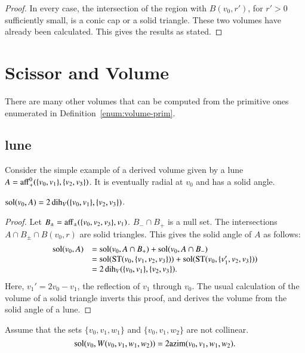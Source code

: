 \begin{proof} In every case, the intersection of 
  the region with $B(v_0,r')$, for $r'>0$ sufficiently small, is
  a conic cap or a solid triangle.  These two volumes have
  already been calculated.  This gives the results as stated.
\end{proof}


\section{Scissor and Volume}

There are many other volumes that can be computed from the
primitive ones enumerated in Definition~\ref{enum:volume-prim}.

\subsection{lune}  

Consider the simple example of a derived volume given by a
lune $A={\operatorname{aff}}_+^0(\{v_0,v_1\},\{v_2,v_3\})$.  It is eventually
radial at $v_0$ and has a solid angle.

\begin{lemma}  $\operatorname{sol}(v_0,A) = 2\operatorname{dih}_V(\{v_0,v_1\},\{v_2,v_3\})$.
\end{lemma}

\begin{proof}
Let $B_{\pm} = {\operatorname{aff}}_\pm(\{v_0,v_2,v_3\},v_1)$.  $B_- \cap B_+$
is a null set.  The intersections $A\cap B_{\pm}\cap B(v_0,r)$ 
are solid triangles.  This gives the solid angle of $A$ as
follows:
   $$\begin{array}{lll}
   \operatorname{sol}(v_0,A) &= \operatorname{sol}(v_0,A\cap B_+)+\operatorname{sol}(v_0,A\cap B_-) \\
   &= 
   \operatorname{sol}({\operatorname{ST}}(v_0,\{v_1,v_2,v_3\})) + \operatorname{sol}({\operatorname{ST}}(v_0,\{v_1',v_2,v_3\})) \\
   &=
   2\operatorname{dih}_V(\{v_0,v_1\},\{v_2,v_3\}).
   \end{array}
   $$
Here,  $v_1'= 2 v_0 - v_1$, the reflection of $v_1$
through $v_0$.  The usual calculation of the volume of a solid triangle
inverts this proof, 
and derives the volume from the solid angle of a lune.
\end{proof}



\begin{lemma} 
Assume that the sets $\{v_0,v_1,w_1\}$ and
$\{v_0,v_1,w_2\}$ are not collinear. 
$$\operatorname{sol}(v_0,W(v_0,v_1,w_1,w_2)) = 2{\operatorname{azim}}(v_0,v_1,w_1,w_2).$$
\end{lemma}    

